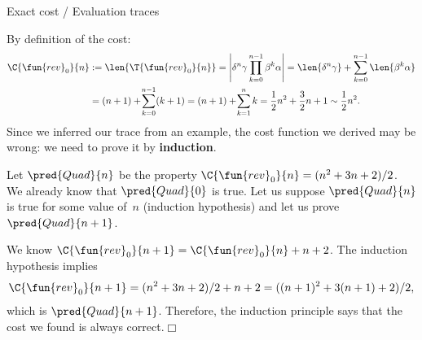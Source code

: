 %
\begin{frame}{Exact cost / Evaluation traces}

  By definition of the cost:
  \begin{align*}
    \C{\fun{rev}_0}{n}
    & \; \text{:=} \; \len{\T{\fun{rev}_0}{n}}
    = \left\lvert\delta^n\gamma \prod_{k=0}^{n-1}{\beta^k\alpha}\right\lvert
    = \len{\delta^n\gamma} + \sum_{k=0}^{n-1}\len{\beta^k\alpha}\\
    & = (n+1) + \!\sum_{k=0}^{n-1}(k+1)
      = (n+1) + \!\sum_{k=1}^{n}k
      =  \frac{1}{2}n^2 + \frac{3}{2}n + 1
      \sim  \frac{1}{2}n^2.
  \end{align*}
  Since we inferred our trace from an example, the cost function we
  derived may be wrong: we need to prove it by \textbf{induction}.

  \medskip

  Let \(\pred{Quad}{n}\) be the property \(\C{\fun{rev}_0}{n} = (n^2 +
  3n + 2)/2\). We already know that \(\pred{Quad}{0}\) is true. Let us
  suppose \(\pred{Quad}{n}\) is true for some value of~\(n\)
  (induction hypothesis) and let us prove \(\pred{Quad}{n+1}\).

  \medskip

  We know \(\C{\fun{rev}_0}{n+1} = \C{\fun{rev}_0}{n} + n + 2\). The
  induction hypothesis implies
  \begin{equation*}
    \C{\fun{rev}_0}{n+1}
    = (n^2 + 3n + 2)/2 + n + 2
    = ((n+1)^2 + 3(n+1) + 2)/2,
  \end{equation*}
  which is \(\pred{Quad}{n+1}\). Therefore, the induction principle
  says that the cost we found is always correct.\hfill\(\Box\)

\end{frame}

